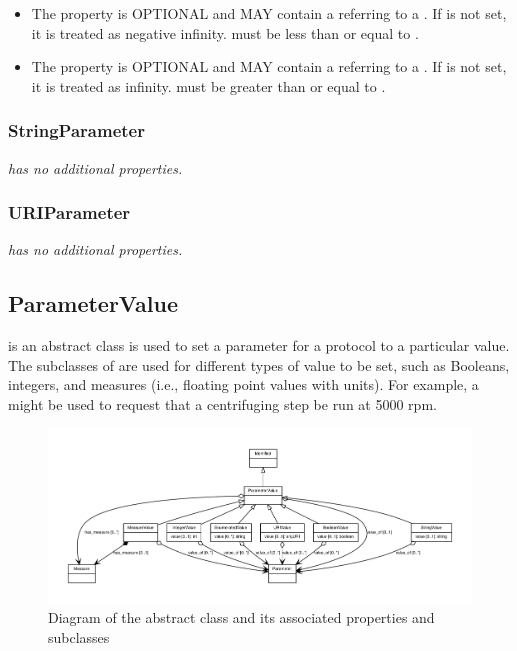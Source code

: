 \begin{itemize}
\item \label{sec:minMeasure}
The  property is OPTIONAL and MAY contain a  referring to a .
If  is not set, it is treated as negative infinity.
 must be less than or equal to .

\item \label{sec:maxMeasure}
The  property is OPTIONAL and MAY contain a  referring to a .
If  is not set, it is treated as infinity.
 must be greater than or equal to .
\end{itemize}

\subsubsection{StringParameter}
\label{sec:StringParameter}

{\em {} has no additional properties.}

\subsubsection{URIParameter}
\label{sec:URIParameter}

{\em {} has no additional properties.}


\subsection{ParameterValue}
\label{sec:ParameterValue}

 is an abstract class is used to set a parameter for a protocol to a particular value. 
The subclasses of  are used for different types of value to be set, such as Booleans, integers, and measures (i.e., floating point values with units).
For example, a  might be used to request that a centrifuging step be run at 5000 rpm.

\begin{figure}[ht]
\begin{center}
\includegraphics[scale=0.6]{figures/ParameterValue_definition_and_abstraction}
\caption[]{Diagram of the  abstract class and its associated properties and subclasses}
\label{uml:ParameterValue}
\end{center}
\end{figure}

